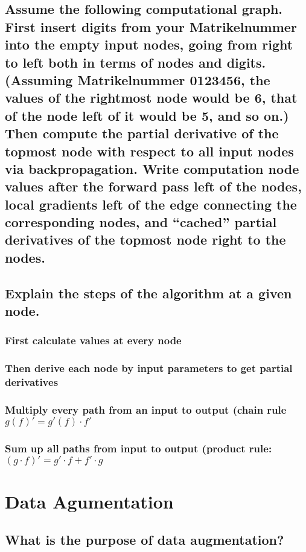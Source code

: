 \subsection{Assume the following computational graph. First insert digits from your Matrikelnummer into the empty input nodes, going from right to left both in terms of nodes and digits. (Assuming Matrikelnummer 0123456, the values of the rightmost node would be 6, that of the node left of it would be 5, and so on.) Then compute the partial derivative of the topmost node with respect to all input nodes via  backpropagation. Write computation node values after the forward pass left of the nodes, local gradients left of the edge connecting the corresponding nodes, and “cached” partial derivatives of the topmost node right to the nodes.}

\subsection{Explain the steps of the algorithm at a given node.}

\subsubsection{ First calculate values at every node}

\subsubsection{ Then derive each node by input parameters to get partial derivatives}

\subsubsection{ Multiply every path from an input to output (chain rule $g(f)' = g'(f)\cdot f'$}

\subsubsection{ Sum up all paths from input to output (product rule: $(g\cdot f)' = g'\cdot f + f'\cdot g$}
\section{Data Agumentation}

\subsection{What is the purpose of data augmentation?}

